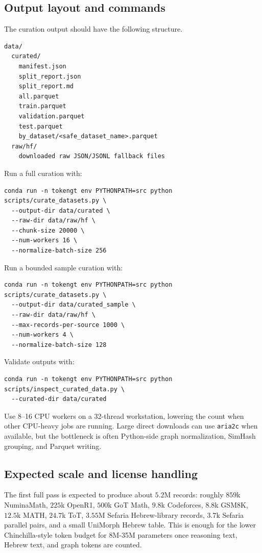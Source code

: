 \documentclass[11pt]{article}
\theoremstyle{definition}
\theoremstyle{plain}
\theoremstyle{remark}
\numberwithin{equation}{section}
\begin{document}
\subsection{Output layout and commands}

The curation output should have the following structure.
\begin{verbatim}
data/
  curated/
    manifest.json
    split_report.json
    split_report.md
    all.parquet
    train.parquet
    validation.parquet
    test.parquet
    by_dataset/<safe_dataset_name>.parquet
  raw/hf/
    downloaded raw JSON/JSONL fallback files
\end{verbatim}
Run a full curation with:
\begin{verbatim}
conda run -n tokengt env PYTHONPATH=src python scripts/curate_datasets.py \
  --output-dir data/curated \
  --raw-dir data/raw/hf \
  --chunk-size 20000 \
  --num-workers 16 \
  --normalize-batch-size 256
\end{verbatim}
Run a bounded sample curation with:
\begin{verbatim}
conda run -n tokengt env PYTHONPATH=src python scripts/curate_datasets.py \
  --output-dir data/curated_sample \
  --raw-dir data/raw/hf \
  --max-records-per-source 1000 \
  --num-workers 4 \
  --normalize-batch-size 128
\end{verbatim}
Validate outputs with:
\begin{verbatim}
conda run -n tokengt env PYTHONPATH=src python scripts/inspect_curated_data.py \
  --curated-dir data/curated
\end{verbatim}
Use 8--16 CPU workers on a 32-thread workstation, lowering the count when other CPU-heavy jobs are running.  Large direct downloads can use \texttt{aria2c} when available, but the bottleneck is often Python-side graph normalization, SimHash grouping, and Parquet writing.

\subsection{Expected scale and license handling}

The first full pass is expected to produce about $5.2$M records: roughly $859$k NuminaMath, $225$k OpenR1, $500$k GoT Math, $9.8$k Codeforces, $8.8$k GSM8K, $12.5$k MATH, $24.7$k ToT, $3.55$M Sefaria Hebrew-library records, $3.7$k Sefaria parallel pairs, and a small UniMorph Hebrew table.  This is enough for the lower Chinchilla-style token budget for 8M-35M parameters once reasoning text, Hebrew text, and graph tokens are counted.
\end{document}
